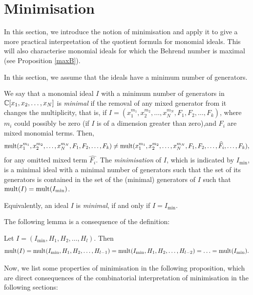 \documentclass[11pt,a4paper,leqno,noamsfonts]{amsart}
\numberwithin{equation}{section}
\begin{document}
\section{Minimisation}\label{minimisation} 
In this section, we introduce the notion of minimisation and apply it to give a more practical interpretation of the quotient formula for monomial ideals. 
This will also characterise monomial ideals for which the Behrend number is maximal (see Proposition \ref{maxB}). 

\begin{convention*}
    In this section, we assume that
the ideals have a minimum number of generators. 
\end{convention*}



\begin{definition}
We say that a monomial ideal $I$ with a minimum number of generators in ${\mathbb{C}}[x_1,x_2,\ldots,x_N]$ is \textit{minimal} if the removal of any mixed generator from it changes the multiplicity, that is, if $I= (x_1^{m_1}, x_2^{m_2},\ldots,x_N^{m_N},F_1,F_2,\ldots , F_k)$, where $m_i$ could possibly be zero (if $I$ is of a dimension greater than zero),and $F_i$ are mixed monomial terms. Then, $$\mathrm{mult} (x_1^{m_1}, x_2^{m_2},\ldots,x_N^{m_N},F_1,F_2,\ldots , F_k)\neq \mathrm{mult} (x_1^{m_1}, x_2^{m_2},\ldots,x_N^{m_N},F_1,F_2,\ldots,\widehat{F_i},\ldots, F_k),$$ for any omitted mixed term $\widehat{F_i}$. The \textit{minimisation} of $I$, which is indicated by $I_{\min}$, is a minimal ideal with a minimal number of generators such that the set of its generators is contained in the set of the (minimal) generators of $I$ such that $\mathrm{mult} (I)=\mathrm{mult} (I_{\min})$.


Equivalently, an ideal $I$ is \textit{minimal}, if and only if $I=I_{\min}$.
\end{definition}




The following lemma is a consequence of the definition:

\begin{lemma}
Let $I=(I_{\min}, H_1,H_2,\ldots,H_l)$. Then
$$\mathrm{mult} (I)=\mathrm{mult} (I_{\min}, H_1,H_2,\ldots,H_{l-1})=\mathrm{mult} (I_{\min}, H_1,H_2,\ldots,H_{l-2})=\ldots=\mathrm{mult} (I_{\min}).$$
\end{lemma}

Now, we list some properties of minimisation in the following proposition, which are direct consequences of the combinatorial interpretation of minimisation in the following sections:
\end{document}
